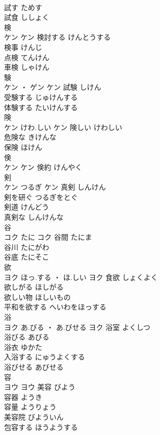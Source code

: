 \documentclass[8pt]{extreport}
\begin{document}
\begin{CJK}{UTF8}{min}
\\	試す	ためす	
\\	試食	ししょく	
\\	検	
\\	ケン		ケン	検討する	けんとうする	
\\	検事	けんじ	
\\	点検	てんけん	
\\	車検	しゃけん	
\\	験	
\\	ケン ・ ゲン		ケン	試験	しけん	
\\	受験する	じゅけんする	
\\	体験する	たいけんする	
\\	険	
\\	ケン	けわ.しい	ケン	険しい	けわしい	
\\	危険な	きけんな	
\\	保険	ほけん	
\\	倹	
\\	ケン		ケン													倹約	けんやく	
\\	剣	
\\	ケン	つるぎ	ケン	真剣	しんけん	
\\	剣を研ぐ	つるぎをとぐ	
\\	剣道	けんどう	
\\	真剣な	しんけんな	
\\	谷	
\\	コク	たに	コク	谷間	たにま	
\\	谷川	たにがわ	
\\	谷底	たにそこ	
\\	欲	
\\	ヨク	ほっ.する ・ ほ.しい	ヨク	食欲	しょくよく	
\\	欲しがる	ほしがる	
\\	欲しい物	ほしいもの	
\\	平和を欲する	へいわをほっする	
\\	浴	
\\	ヨク	あ.びる ・ あ.びせる	ヨク	浴室	よくしつ	
\\	浴びる	あびる	
\\	浴衣	ゆかた	
\\	入浴する	にゅうよくする	
\\	浴びせる	あびせる	
\\	容	
\\	ヨウ		ヨウ	美容	びよう	
\\	容器	ようき	
\\	容量	ようりょう	
\\	美容院	びよういん	
\\	包容する	ほうようする	

\end{CJK}
\end{document}
